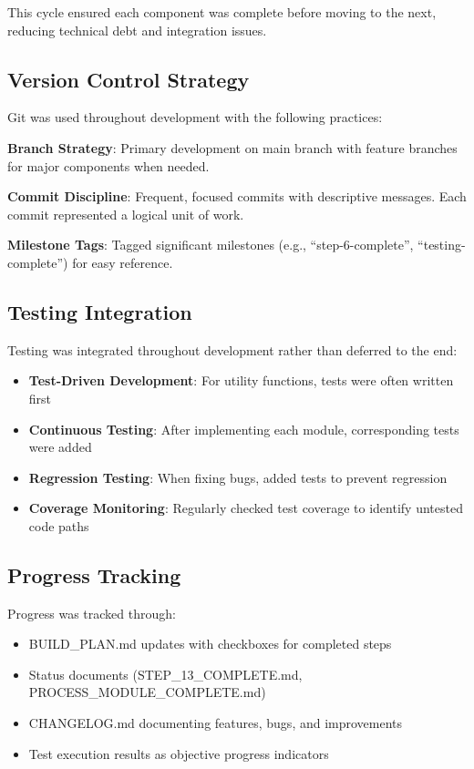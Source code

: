\documentclass[12pt,a4paper,oneside]{report}
\begin{document}
This cycle ensured each component was complete before moving to the next, reducing technical debt and integration issues.

\subsection{Version Control Strategy}

Git was used throughout development with the following practices:

\textbf{Branch Strategy}: Primary development on main branch with feature branches for major components when needed.

\textbf{Commit Discipline}: Frequent, focused commits with descriptive messages. Each commit represented a logical unit of work.

\textbf{Milestone Tags}: Tagged significant milestones (e.g., ``step-6-complete'', ``testing-complete'') for easy reference.

\subsection{Testing Integration}

Testing was integrated throughout development rather than deferred to the end:

\begin{itemize}
    \item \textbf{Test-Driven Development}: For utility functions, tests were often written first
    \item \textbf{Continuous Testing}: After implementing each module, corresponding tests were added
    \item \textbf{Regression Testing}: When fixing bugs, added tests to prevent regression
    \item \textbf{Coverage Monitoring}: Regularly checked test coverage to identify untested code paths
\end{itemize}

\subsection{Progress Tracking}

Progress was tracked through:
\begin{itemize}
    \item BUILD\_PLAN.md updates with checkboxes for completed steps
    \item Status documents (STEP\_13\_COMPLETE.md, PROCESS\_MODULE\_COMPLETE.md)
    \item CHANGELOG.md documenting features, bugs, and improvements
    \item Test execution results as objective progress indicators
\end{itemize}
\end{document}
